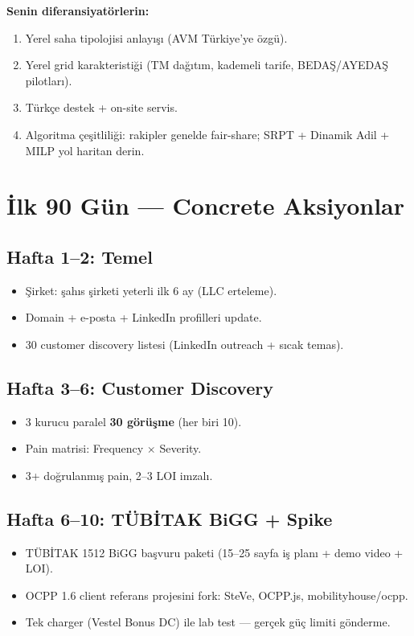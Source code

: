 \documentclass[11pt,a4paper]{article}
\begin{document}
\textbf{Senin diferansiyatörlerin:}
\begin{enumerate}
    \item Yerel saha tipolojisi anlayışı (AVM Türkiye'ye özgü).
    \item Yerel grid karakteristiği (TM dağıtım, kademeli tarife, BEDAŞ/AYEDAŞ pilotları).
    \item Türkçe destek + on-site servis.
    \item Algoritma çeşitliliği: rakipler genelde fair-share; SRPT + Dinamik Adil + MILP yol haritan derin.
\end{enumerate}

\section{İlk 90 Gün --- Concrete Aksiyonlar}

\subsection{Hafta 1--2: Temel}
\begin{itemize}
    \item Şirket: şahıs şirketi yeterli ilk 6 ay (LLC erteleme).
    \item Domain + e-posta + LinkedIn profilleri update.
    \item 30 customer discovery listesi (LinkedIn outreach + sıcak temas).
\end{itemize}

\subsection{Hafta 3--6: Customer Discovery}
\begin{itemize}
    \item 3 kurucu paralel \textbf{30 görüşme} (her biri 10).
    \item Pain matrisi: Frequency $\times$ Severity.
    \item 3+ doğrulanmış pain, 2--3 LOI imzalı.
\end{itemize}

\subsection{Hafta 6--10: TÜBİTAK BiGG + Spike}
\begin{itemize}
    \item TÜBİTAK 1512 BiGG başvuru paketi (15--25 sayfa iş planı + demo video + LOI).
    \item OCPP 1.6 client referans projesini fork: SteVe, OCPP.js, mobilityhouse/ocpp.
    \item Tek charger (Vestel Bonus DC) ile lab test --- gerçek güç limiti gönderme.
\end{itemize}
\end{document}
